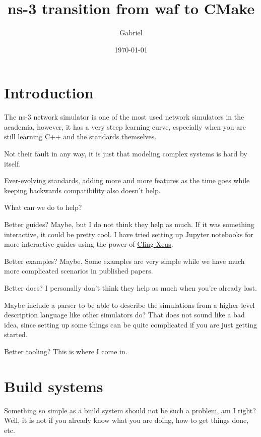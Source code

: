 \documentclass{article}
\title{ns-3 transition from waf to CMake}
\author{Gabriel}
\date{\today}
\begin{document}
\maketitle

\begin{abstract}
\end{abstract}

\section*{Introduction}
    The ns-3 network simulator is one of the most used network simulators in the academia,
    however, it has a very steep learning curve, especially when you are still learning C++ and the standards themselves.

    Not their fault in any way, it is just that modeling complex systems is hard by itself.

    Ever-evolving standards, adding more and more features as the time goes while keeping backwards compatibility
    also doesn't help.

    What can we do to help?

    Better guides? Maybe, but I do not think they help as much. If it was something interactive,
    it could be pretty cool.
    I have tried setting up Jupyter notebooks for more interactive guides using the power
    of \href{https://github.com/jupyter-xeus/xeus-cling}{Cling-Xeus}.

    Better examples? Maybe. Some examples are very simple while we have much more complicated scenarios
    in published papers.

    Better docs? I personally don't think they help as much when you're already lost.

    Maybe include a parser to be able to describe the simulations from a higher level description language
    like other simulators do?
    That does not sound like a bad idea, since setting up some things can be quite complicated if you are just getting
    started.

    Better tooling? This is where I come in.

\section*{Build systems}
    Something so simple as a build system should not be such a problem, am I right? Well, it is not if you already know
    what you are doing, how to get things done, etc.
\end{document}
